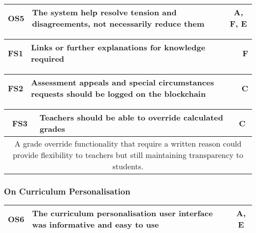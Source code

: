 \begin{table}[!ht]
	\begin{tabularx}{\textwidth}{|c|X|c|}
		\hline
		OS5 & \textbf{The system help resolve tension and disagreements, not necessarily reduce them} & A, F, E                 \\
		\hline
	\end{tabularx}
\end{table}

\begin{table}[!ht]
	\begin{tabularx}{\textwidth}{|c|X|c|}
		\hline
		FS1 & \textbf{Links or further explanations for knowledge required} & F                 \\
		\hline
	\end{tabularx}
\end{table}

\begin{table}[!ht]
	\begin{tabularx}{\textwidth}{|c|X|c|}
		\hline
		FS2 & \textbf{Assessment appeals and special circumstances requests should be logged on the blockchain} & C                 \\
		\hline
	\end{tabularx}
\end{table}

\begin{table}[!ht]
	\begin{tabularx}{\textwidth}{|c|X|c|}
		\hline
		FS3 & \textbf{Teachers should be able to override calculated grades} & C                 \\
		\hline
		\multicolumn{3}{|X|}{
			A grade override functionality that require a written reason could provide 
			flexibility to teachers but still maintaining transparency to students.
		} \\
		\hline
	\end{tabularx}
\end{table}

\subsubsection{On Curriculum Personalisation}

\begin{table}[!ht]
	\begin{tabularx}{\textwidth}{|c|X|c|}
		\hline
		OS6 & \textbf{The curriculum personalisation user interface was informative and easy to use} & A, E                 \\
		\hline
	\end{tabularx}
\end{table}

